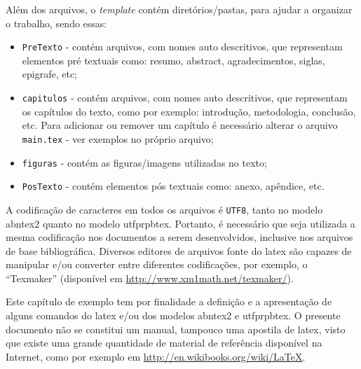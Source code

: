 Além dos arquivos, o \textit{template} contém diretórios/pastas, para ajudar a organizar o trabalho, sendo essas:
\begin{itemize}%
    \item \texttt{PreTexto} - contém arquivos, com nomes auto descritivos, que representam elementos pré textuais como:  resumo, abstract, agradecimentos, siglas, epigrafe, etc;
    \item \texttt{capitulos} -  contém arquivos, com nomes auto descritivos, que representam os capítulos do texto, como por exemplo: introdução, metodologia, conclusão, etc. Para adicionar ou remover um capítulo é necessário alterar o arquivo \texttt{main.tex} - ver exemplos no próprio arquivo;
    \item \texttt{figuras}  - contém as figuras/imagens utilizadas no texto;
    \item \texttt{PosTexto} - contém elementos pós textuais como: anexo, apêndice, etc.
\end{itemize}

A codificação de caracteres em todos os arquivos é \texttt{UTF8}, tanto no modelo \gls{abntex2} quanto no modelo \gls{utfprpbtex}. Portanto, é necessário que seja utilizada a mesma codificação nos documentos a serem desenvolvidos, inclusive nos arquivos de base bibliográfica. Diversos editores de arquivos fonte do \gls{latex} são capazes de manipular e/ou converter entre diferentes codificações, por exemplo, o ``Texmaker'' (disponível em \url{http://www.xm1math.net/texmaker/}).

Este capítulo\label{errata:capitulo} de exemplo tem por finalidade a definição e a apresentação de alguns comandos do \gls{latex} e/ou dos modelos \gls{abntex2} e \gls{utfprpbtex}. O presente documento não se constitui um manual, tampouco uma apostila de \gls{latex}, visto que existe uma grande quantidade de material de referência disponível na Internet, como por exemplo em \url{http://en.wikibooks.org/wiki/LaTeX}.

